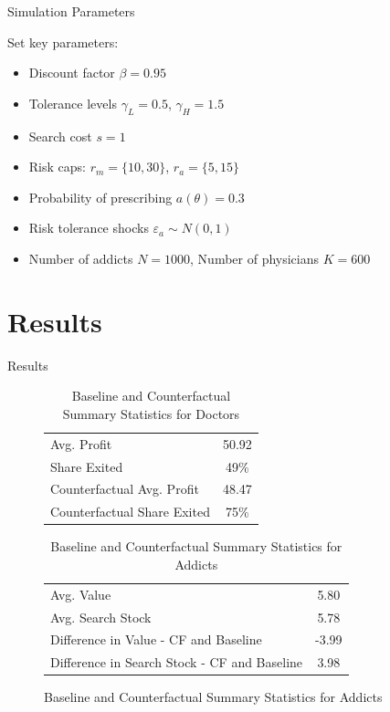 \documentclass[aspectratio=169,professionalfonts]{beamer}
\begin{document}
  \begin{frame}{Simulation Parameters}
    \item Set key parameters:
    \begin{itemize}
      \item Discount factor $\beta = 0.95$
      \item Tolerance levels $\gamma_L = 0.5$, $\gamma_H = 1.5$
      \item Search cost $s = 1$
      \item Risk caps: $r_m = \{10,30\}$, $r_a = \{5,15\}$
      \item Probability of prescribing $a(\theta) = 0.3$      
      \item Risk tolerance shocks $\varepsilon_a \sim N(0,1)$
      \item Number of addicts $N = 1000$, Number of physicians $K = 600$
    \end{itemize}
  \end{frame}

\section{Results}

\begin{frame}{Results}

  \begin{figure}
    \begin{table}[htbp]
      \centering
      \caption{Baseline and Counterfactual Summary Statistics for Doctors}
      \begin{tabular}{|l|c|}
      \hline
        Avg. Profit & 50.92 \\
        Share Exited & 49\% \\
        Counterfactual Avg. Profit & 48.47 \\
        Counterfactual Share Exited & 75\% \\
      \hline
      \end{tabular}
      \label{tab:baseline_counterfactual_stats}
    \end{table}
    \vline
    \begin{table}[htbp]
      \centering
      \caption{Baseline and Counterfactual Summary Statistics for Addicts}
      \begin{tabular}{|l|c|}
      \hline
        Avg. Value & 5.80 \\
        Avg. Search Stock & 5.78 \\
        Difference in Value - CF and Baseline & -3.99 \\
        Difference in Search Stock - CF and Baseline & 3.98 \\
      \hline
      \end{tabular}
      \label{tab:baseline_counterfactual_stats_addicts}
    \end{table}
  \end{figure}
\end{frame}
\end{document}
